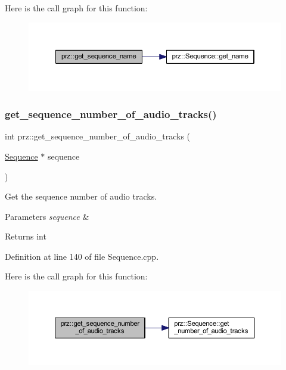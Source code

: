 Here is the call graph for this function\+:
\nopagebreak
\begin{figure}[H]
\begin{center}
\leavevmode
\includegraphics[width=350pt]{namespaceprz_a330a844981433fc9a6bb57a32bcdc7d4_cgraph}
\end{center}
\end{figure}
\mbox{\label{namespaceprz_a261fb90bd1c2cd3d75ceea90968338ed}} 
\subsubsection{\texorpdfstring{get\_sequence\_number\_of\_audio\_tracks()}{get\_sequence\_number\_of\_audio\_tracks()}}
{\footnotesize\ttfamily int prz\+::get\+\_\+sequence\+\_\+number\+\_\+of\+\_\+audio\+\_\+tracks (\begin{DoxyParamCaption}\item[{\mbox{\hyperlink{classprz_1_1_sequence}{Sequence}} $\ast$}]{sequence }\end{DoxyParamCaption})}



Get the sequence number of audio tracks. 


\begin{DoxyParams}{Parameters}
{\em sequence} & \\
\hline
\end{DoxyParams}
\begin{DoxyReturn}{Returns}
int 
\end{DoxyReturn}


Definition at line 140 of file Sequence.\+cpp.

Here is the call graph for this function\+:
\nopagebreak
\begin{figure}[H]
\begin{center}
\leavevmode
\includegraphics[width=350pt]{namespaceprz_a261fb90bd1c2cd3d75ceea90968338ed_cgraph}
\end{center}
\end{figure}
\mbox{\label{namespaceprz_adc24118c391c79c034821170e7249c4d}} 
